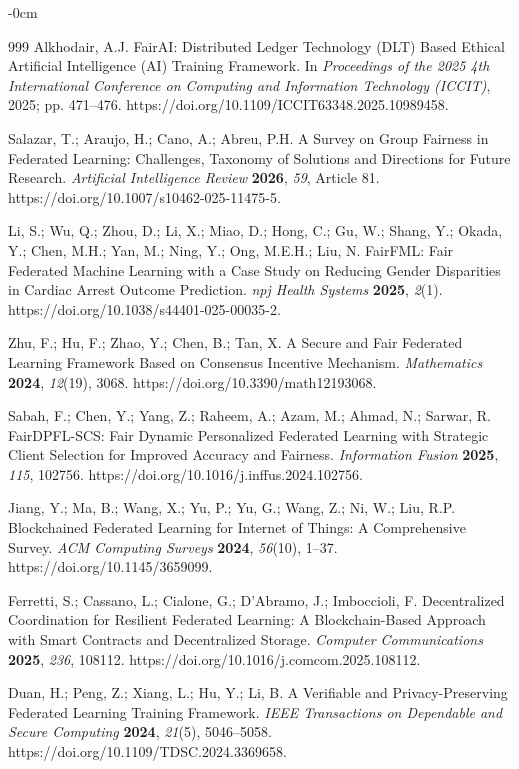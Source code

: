 \documentclass[futureinternet,article,submit,pdftex,moreauthors]{Definitions/mdpi}
\begin{document}
\begin{adjustwidth}{-\extralength}{0cm}
\begin{thebibliography}{999}
Alkhodair, A.J.
FairAI: Distributed Ledger Technology (DLT) Based Ethical Artificial Intelligence (AI) Training Framework.
In \textit{Proceedings of the 2025 4th International Conference on Computing and Information Technology (ICCIT)}, 2025; pp. 471--476.
https://doi.org/10.1109/ICCIT63348.2025.10989458.

Salazar, T.; Araujo, H.; Cano, A.; Abreu, P.H.
A Survey on Group Fairness in Federated Learning: Challenges, Taxonomy of Solutions and Directions for Future Research.
\textit{Artificial Intelligence Review} \textbf{2026}, \textit{59}, Article 81.
https://doi.org/10.1007/s10462-025-11475-5.

Li, S.; Wu, Q.; Zhou, D.; Li, X.; Miao, D.; Hong, C.; Gu, W.; Shang, Y.; Okada, Y.; Chen, M.H.; Yan, M.; Ning, Y.; Ong, M.E.H.; Liu, N.
FairFML: Fair Federated Machine Learning with a Case Study on Reducing Gender Disparities in Cardiac Arrest Outcome Prediction.
\textit{npj Health Systems} \textbf{2025}, \textit{2}(1).
https://doi.org/10.1038/s44401-025-00035-2.

Zhu, F.; Hu, F.; Zhao, Y.; Chen, B.; Tan, X.
A Secure and Fair Federated Learning Framework Based on Consensus Incentive Mechanism.
\textit{Mathematics} \textbf{2024}, \textit{12}(19), 3068.
https://doi.org/10.3390/math12193068.

Sabah, F.; Chen, Y.; Yang, Z.; Raheem, A.; Azam, M.; Ahmad, N.; Sarwar, R.
FairDPFL-SCS: Fair Dynamic Personalized Federated Learning with Strategic Client Selection for Improved Accuracy and Fairness.
\textit{Information Fusion} \textbf{2025}, \textit{115}, 102756.
https://doi.org/10.1016/j.inffus.2024.102756.

Jiang, Y.; Ma, B.; Wang, X.; Yu, P.; Yu, G.; Wang, Z.; Ni, W.; Liu, R.P.
Blockchained Federated Learning for Internet of Things: A Comprehensive Survey.
\textit{ACM Computing Surveys} \textbf{2024}, \textit{56}(10), 1--37.
https://doi.org/10.1145/3659099.

Ferretti, S.; Cassano, L.; Cialone, G.; D'Abramo, J.; Imboccioli, F.
Decentralized Coordination for Resilient Federated Learning: A Blockchain-Based Approach with Smart Contracts and Decentralized Storage.
\textit{Computer Communications} \textbf{2025}, \textit{236}, 108112.
https://doi.org/10.1016/j.comcom.2025.108112.

Duan, H.; Peng, Z.; Xiang, L.; Hu, Y.; Li, B.
A Verifiable and Privacy-Preserving Federated Learning Training Framework.
\textit{IEEE Transactions on Dependable and Secure Computing} \textbf{2024}, \textit{21}(5), 5046--5058.
https://doi.org/10.1109/TDSC.2024.3369658.


\end{thebibliography}
\end{adjustwidth}
\end{document}
